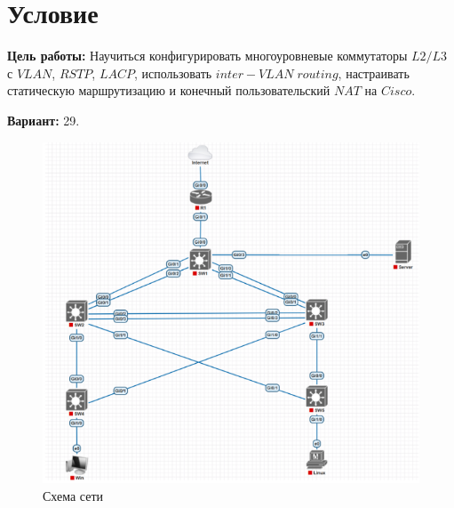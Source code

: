 \section{Условие}
{\bfseries Цель работы:} Научиться конфигурировать многоуровневые коммутаторы $L2/L3$ с $VLAN$, $RSTP$, $LACP$, использовать $inter-VLAN\;routing$, 
настраивать статическую маршрутизацию и конечный пользовательский $NAT$ на $Cisco$.

{\bfseries Вариант:} 29.

\begin{figure}[h!]
    \centering
    \includegraphics[scale=0.75]{./img/sheme.png}
    \caption{Схема сети}
\end{figure}

